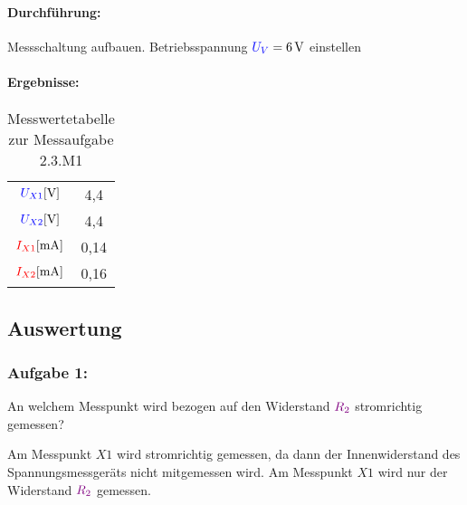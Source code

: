 \documentclass[a4paper,titlepage,parskip]{scrreprt}
\newcommand{\spannung}[1]{\textcolor{blue}{#1}}
\newcommand{\strom}[1]{\textcolor{red}{#1}}
\newcommand{\widerstand}[1]{\textcolor{violet}{#1}}
\begin{document}
                    \paragraph{Durchführung:} Messschaltung aufbauen. Betriebsspannung $\spannung{U_V} = \SI{6}{\volt}$ einstellen
                    \pagebreak
                    \paragraph{Ergebnisse:}
                        \begin{center}
                            \begin{table}[!hbtp]
                                \caption{Messwertetabelle zur Messaufgabe 2.3.M1}
                                \label{tbl:messergebnisse2.2}
                                \renewcommand{\arraystretch}{1.3}
                                \begin{center}
                                    \begin{tabular}{c|c}
                                        $\spannung{U_{X1}} [\si{\volt}]$ & 4,4\\
                                        $\spannung{U_{X2}} [\si{\volt}]$ & 4,4\\ \hline
                                        $\strom{I_{X1}} [\si{\milli\ampere}]$ & 0,14\\
                                        $\strom{I_{X2}} [\si{\milli\ampere}]$ & 0,16
                                    \end{tabular}
                                \end{center}
                            \end{table}
                        \end{center}
                  
                
            \subsection{Auswertung}
                \subsubsection{Aufgabe 1:}  An welchem Messpunkt wird bezogen auf den Widerstand $\widerstand{R_2}$ stromrichtig gemessen?
                
                Am Messpunkt $X1$ wird stromrichtig gemessen, da dann der Innenwiderstand des Spannungsmessgeräts nicht mitgemessen wird. Am Messpunkt $X1$ wird nur der Widerstand $\widerstand{R_2}$ gemessen.
                
\end{document}
